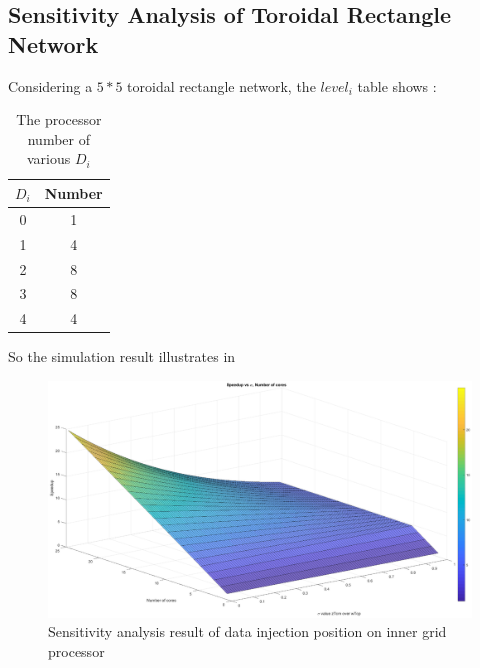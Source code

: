 \subsection{Sensitivity Analysis of Toroidal Rectangle Network}
Considering a $5*5$ toroidal rectangle network, the $level_{i}$ table shows :
\begin{table}
\centering
\small
\setlength\tabcolsep{2pt}
\begin{tabular}{|c|c|}
\hline
    $D_{i}$ & Number\\ 
    \hline
    0 & 1 \\ \hline
    1 & 4 \\ \hline
    2 & 8\\ \hline
    3 & 8\\ \hline
    4 & 4 \\ \hline
\end{tabular}
\caption{The processor number of various $D_{i}$}
\label{tab:dn_2}
\end{table}

So the simulation result illustrates in 
\begin{figure}[!ht]
\centering
\includegraphics[width=1\columnwidth]{figure/sa5t5_torus.eps}
\caption{Sensitivity analysis result of data injection position on inner grid processor}
\label{fig:sa5t5_torus_no}
\end{figure}
\newpage